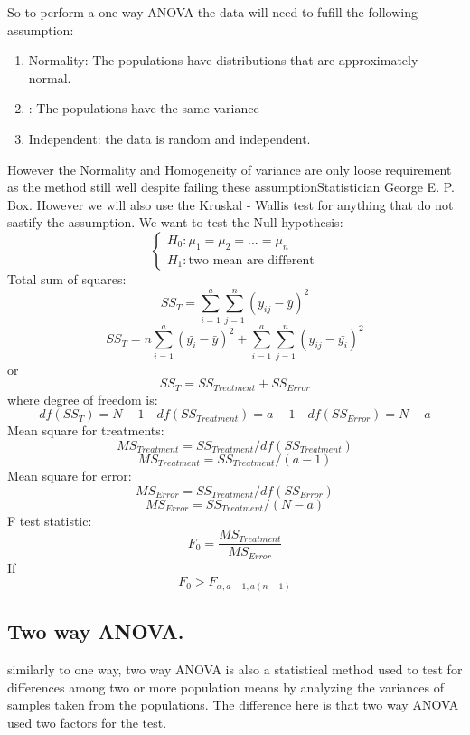 So to perform a one way ANOVA the data will need to fufill the following assumption:
\begin{enumerate}
    \item Normality: The populations have distributions that are approximately normal.
    \item   : The populations have the same variance
    \item Independent: the data is random and independent.
\end{enumerate}
However the Normality and Homogeneity of variance are only loose requirement as the method still well despite failing these assumptionStatistician George E. P. Box.
However we will also use the Kruskal - Wallis test for anything that do not sastify the assumption.
We want to test the Null hypothesis:
\[
\begin{cases}
    H_0: \mu_1 = \mu_2 = ... = \mu_n \\
    H_1: \text{two mean are different}
\end{cases}
\]
Total sum of squares:
\[ SS_T = \sum_{i = 1}^{a} \sum_{j = 1}^{n} (y_{ij} - \bar{y})^2\]
\[ SS_T = n\sum_{i=1}^{a}(\bar{y_i}-\bar{y})^2 + \sum_{i=1}^{a}\sum_{j=1}^{n}(y_{ij}-\bar{y_i})^2\]
or
\[ SS_T = SS_{Treatment}+SS_{Error}\]
where degree of freedom is:
\[df(SS_T) = N - 1 \quad df(SS_{Treatment}) = a - 1 \quad df(SS_{Error}) = N - a \]
Mean square for treatments: 
\[MS_{Treatment} = SS_{Treatment} / df(SS_{Treatment})\]
\[MS_{Treatment} = SS_{Treatment} / (a - 1)\]
Mean square for error: 
\[MS_{Error} = SS_{Treatment} / df(SS_{Error})\]
\[MS_{Error} = SS_{Treatment} / (N - a)\]   
F test statistic: 
\[F_0 = \frac{MS_{Treatment}}{MS_{Error}}\]
If \[F_0 > F_{\alpha , a-1,a(n-1)}\]

\subsection{Two way ANOVA.}
similarly to one way, two way ANOVA is also a statistical method used to test for differences among two or more population means by analyzing the variances of samples taken from the populations. The difference here is that two way ANOVA used two factors for the test.

